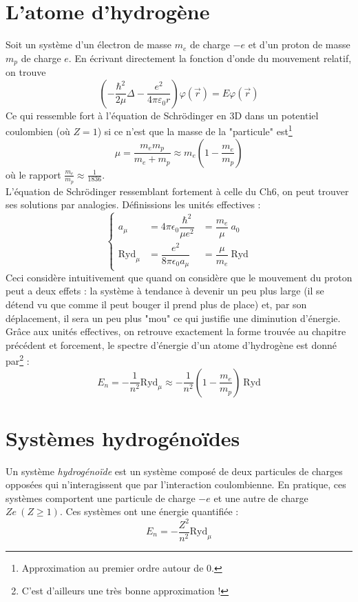 \documentclass	[11pt, a4paper, openany]{book}
\begin{document}
\section{L'atome d'hydrogène}
Soit un système d'un électron de masse $m_e$ de charge $-e$ et d'un proton de masse $m_p$ de charge $e$. En écrivant directement la fonction d'onde du mouvement relatif, on trouve
\begin{equation}
\left(-\frac{\hbar^2}{2\mu}\Delta - \frac{e^2}{4\pi\varepsilon_0 r}\right)\varphi(\vec{r}) = E\varphi(\vec{r})
\end{equation}
Ce qui ressemble fort à l'équation de Schrödinger en 3D dans un potentiel coulombien (où $Z=1$) si ce n'est que la masse de la "particule" est\footnote{Approximation au premier ordre autour de 0.}
\begin{equation}
\mu = \frac{m_em_p}{m_e+m_p} \approx m_e\left(1-\frac{m_e}{m_p}\right)
\end{equation}
où le rapport $\frac{m_e}{m_p} \approx \frac{1}{1836}$.\\
L'équation de Schrödinger ressemblant fortement à celle du Ch6, on peut trouver ses solutions par analogies. Définissions les unités effectives :
\begin{equation}
\left\{\begin{array}{lll}
a_\mu &= 4\pi\epsilon_0 \dfrac{\hbar^2}{\mu e^2} &= \dfrac{m_e}{\mu}\ a_0\\
\text{Ryd}_\mu &= \dfrac{e^2}{8\pi\epsilon_0a_\mu} &= \dfrac{\mu}{m_e}\ \text{Ryd}
\end{array}\right.
\end{equation}
Ceci considère intuitivement que quand on considère que le mouvement du proton peut a deux effets :  la système à tendance à devenir un peu plus large (il se détend vu que comme il peut bouger il prend plus de place)
et, par son déplacement, il sera un peu plus "mou" ce qui justifie une diminution d'énergie.\\

Grâce aux unités effectives, on retrouve exactement la forme trouvée au chapitre précédent et forcement, le spectre d'énergie d'un atome d'hydrogène est donné par\footnote{C'est d'ailleurs une très bonne approximation !} :
\begin{equation}
E_n = -\frac{1}{n^2}\text{Ryd}_\mu \approx -\frac{1}{n^2}\left(1-\frac{m_e}{m_p}\right)\ \text{Ryd}
\end{equation}

\section{Systèmes hydrogénoïdes}
Un système \textit{hydrogénoïde} est un système composé de deux particules de charges opposées qui n'interagissent que par l'interaction coulombienne. En pratique, ces systèmes comportent une particule de charge $-e$ et une autre de charge $Ze\ (Z \geq 1)$. Ces systèmes ont une énergie quantifiée :
\begin{equation}
E_n = -\frac{Z^2}{n^2}\text{Ryd}_\mu
\end{equation}
\end{document}
